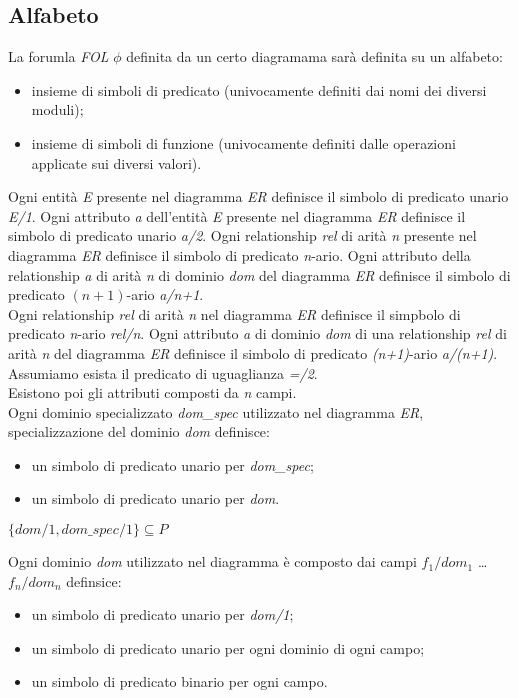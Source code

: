 \subsection{Alfabeto}
La forumla \textit{FOL} $\phi$ definita da un certo diagramama sarà definita su un alfabeto:
\begin{itemize}
	\item insieme di simboli di predicato (univocamente definiti dai nomi dei diversi moduli);
	\item insieme di simboli di funzione (univocamente definiti dalle operazioni applicate sui diversi valori).
\end{itemize}
Ogni entità \textit{E} presente nel diagramma \textit{ER} definisce il simbolo di predicato unario \textit{E/1}. Ogni attributo \textit{a} dell'entità \textit{E} presente nel diagramma \textit{ER} definisce il simbolo di predicato unario \textit{a/2}.
Ogni relationship \textit{rel} di arità \textit{n} presente nel diagramma \textit{ER} definisce il simbolo di predicato \textit{n}-ario.
Ogni attributo della relationship \textit{a} di arità \textit{n} di dominio \textit{dom} del diagramma \textit{ER} definisce il simbolo di predicato $(n+1)$-ario \textit{a/n+1}. \\
Ogni relationship \textit{rel} di arità \textit{n} nel diagramma \textit{ER} definisce il simpbolo di predicato \textit{n}-ario \textit{rel/n}. Ogni attributo \textit{a} di dominio \textit{dom} di una relationship \textit{rel} di arità \textit{n} del diagramma \textit{ER} definisce il simbolo di predicato \textit{(n+1)}-ario \textit{a/(n+1)}.
Assumiamo esista il predicato di uguaglianza \textit{=/2}. \\
Esistono poi gli attributi composti da \textit{n} campi. \\
Ogni dominio specializzato \textit{dom\_spec} utilizzato nel diagramma \textit{ER}, specializzazione del dominio \textit{dom} definisce:
\begin{itemize}
	\item un simbolo di predicato unario per \textit{dom\_spec};
	\item un simbolo di predicato unario per \textit{dom}.
\end{itemize}
\begin{center}
	$\{dom/1, dom\_spec/1\} \subseteq P$
\end{center}
Ogni dominio \textit{dom} utilizzato nel diagramma è composto dai campi $f_1/dom_1$ \ldots $f_n/dom_n$ definsice:
\begin{itemize}
	\item un simbolo di predicato unario per \textit{dom/1};
	\item un simbolo di predicato unario per ogni dominio di ogni campo;
	\item un simbolo di predicato binario per ogni campo.
\end{itemize}
